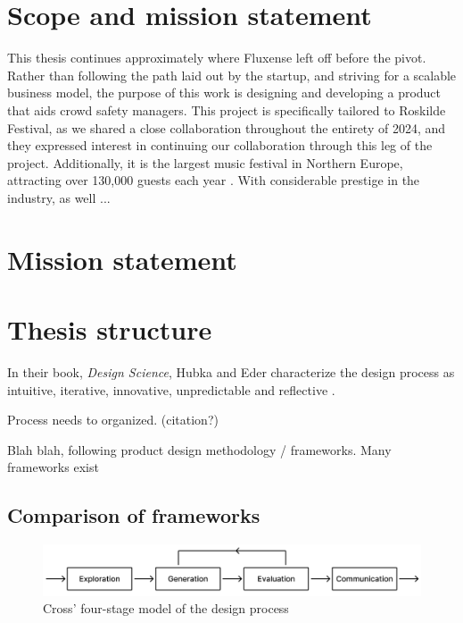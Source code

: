 \section{Scope and mission statement}

This thesis continues approximately where Fluxense left off before the pivot. Rather than following the path laid out by the startup, and striving for a scalable business model, the purpose of this work is designing and developing a product that aids crowd safety managers. This project is specifically tailored to Roskilde Festival, as we shared a close collaboration throughout the entirety of 2024, and they expressed interest in continuing our collaboration through this leg of the project. Additionally, it is the largest music festival in Northern Europe, attracting over 130,000 guests each year \cite{rf}. With considerable prestige in the industry, as well ...



\section{Mission statement}

\section{Thesis structure}

In their book, \textit{Design Science}, Hubka and Eder characterize the design process as intuitive, iterative, innovative, unpredictable and reflective \cite{hubka_eder}.

Process needs to organized. (citation?)

Blah blah, following product design methodology / frameworks. Many frameworks exist

\subsection{Comparison of frameworks}
\vspace{2em}
\begin{figure}[H]
  \centering
  \includegraphics[width=14cm]{Pictures/Figures/cross.png}
  \caption{Cross' four-stage model of the design process}
  \label{fig:cross}
\end{figure}

